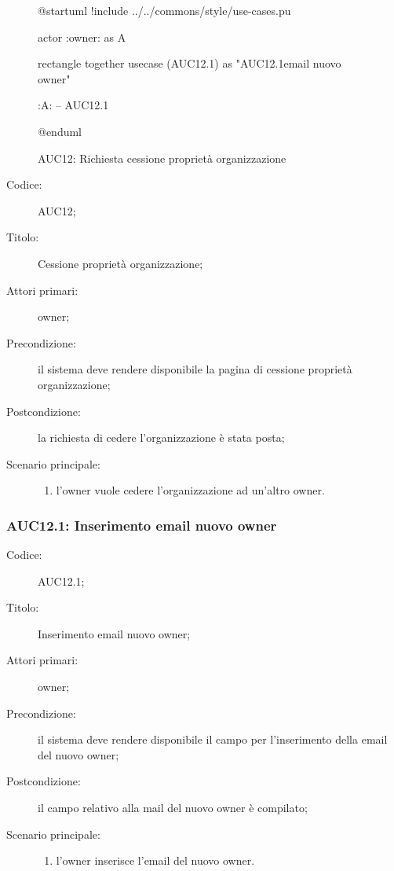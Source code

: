 \documentclass[../../../analisi-dei-requisiti.tex]{subfiles}
\begin{document}
\begin{figure}[H]
  \centering
  \begin{plantuml}
  @startuml
  !include ../../commons/style/use-cases.pu

  actor :owner: as A

  rectangle {
    together {
      usecase (AUC12.1) as "AUC12.1\nInserimento email nuovo owner"
    }
  }

  :A: -- AUC12.1

  @enduml
  \end{plantuml}
  \caption{AUC12: Richiesta cessione proprietà organizzazione}%
  \label{fig:auc12}
\end{figure}

\begin{description}
  \item[Codice:] AUC12;
  \item[Titolo:] Cessione proprietà organizzazione;
  \item[Attori primari:] owner;
  \item[Precondizione:] il sistema deve rendere disponibile la pagina di cessione proprietà organizzazione;
  \item[Postcondizione:] la richiesta di cedere l'organizzazione è stata posta;
  \item[Scenario principale:]
  \begin{enumerate}
    \item l'owner vuole cedere l'organizzazione ad un'altro owner.
  \end{enumerate}
\end{description}

\subsubsection{AUC12.1: Inserimento email nuovo owner}%
\label{subs:AUC12.1}
\begin{description}
  \item[Codice:] AUC12.1;
  \item[Titolo:] Inserimento email nuovo owner;
  \item[Attori primari:] owner;
  \item[Precondizione:] il sistema deve rendere disponibile il campo per l'inserimento della email del nuovo owner;
  \item[Postcondizione:] il campo relativo alla mail del nuovo owner è compilato;
  \item[Scenario principale:]
  \begin{enumerate}
    \item l'owner inserisce l'email del nuovo owner.
  \end{enumerate}
\end{description}
\end{document}
